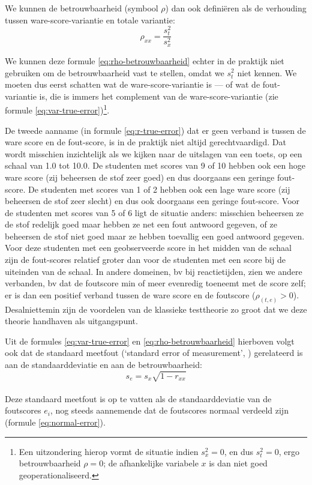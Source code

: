 \documentclass[
]{book}
\begin{document}
We kunnen de betrouwbaarheid (symbool \(\rho\)) dan ook definiëren als de
verhouding tussen ware-score-variantie en totale variantie:
\begin{equation}
  \label{eq:rho-betrouwbaarheid}
  \rho_{xx} = \frac{s^2_t}{s^2_x}
\end{equation}

We kunnen deze formule \eqref{eq:rho-betrouwbaarheid} echter in de praktijk niet gebruiken
om de betrouwbaarheid vast te stellen, omdat we \(s^2_t\) niet kennen. We
moeten dus eerst schatten wat de ware-score-variantie is --- of wat de
fout-variantie is, die is immers het complement van de
ware-score-variantie (zie
formule \eqref{eq:var-true-error})\footnote{Een uitzondering hierop vormt de situatie indien \(s^2_x=0\), en dus \(s^2_t=0\), ergo betrouwbaarheid \(\rho=0\); de afhankelijke variabele \(x\) is dan niet goed geoperationaliseerd.}.

De tweede aanname (in formule \eqref{eq:r-true-error}) dat er geen verband is tussen de ware
score en de fout-score, is in de praktijk niet altijd gerechtvaardigd.
Dat wordt misschien inzichtelijk als we kijken naar de uitslagen van een
toets, op een schaal van 1.0 tot 10.0. De studenten met scores van 9 of
10 hebben ook een hoge ware score (zij beheersen de stof zeer goed) en
dus doorgaans een geringe fout-score. De studenten met scores van 1 of 2
hebben ook een lage ware score (zij beheersen de stof zeer slecht) en
dus ook doorgaans een geringe fout-score. Voor de studenten met scores
van 5 of 6 ligt de situatie anders: misschien beheersen ze de stof
redelijk goed maar hebben ze net een fout antwoord gegeven, of ze
beheersen de stof niet goed maar ze hebben toevallig een goed antwoord
gegeven. Voor deze studenten met een geobserveerde score in het midden
van de schaal zijn de fout-scores relatief groter dan voor de studenten
met een score bij de uiteinden van de schaal. In andere domeinen, bv bij
reactietijden, zien we andere verbanden, bv dat de foutscore min of meer
evenredig toeneemt met de score zelf; er is dan een positief verband
tussen de ware score en de foutscore (\(\rho_{(t,e)}>0\)). Desalniettemin
zijn de voordelen van de klassieke testtheorie zo groot dat we deze
theorie handhaven als uitgangspunt.

Uit de formules \eqref{eq:var-true-error} en \eqref{eq:rho-betrouwbaarheid}
hierboven volgt ook dat de standaard
meetfout (`standard error of measurement', ) gerelateerd is aan de
standaarddeviatie en aan de betrouwbaarheid:
\begin{equation}
   \label{eq:standaard-meetfout}
    s_e = s_x \sqrt{1-r_{xx}}
\end{equation}\\
Deze standaard meetfout is op te vatten
als de standaarddeviatie van de foutscores \(e_i\), nog steeds aannemende
dat de foutscores normaal verdeeld zijn (formule \eqref{eq:normal-error}).
\end{document}
